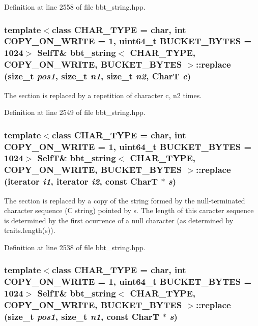 Definition at line 2558 of file bbt\_\-string.hpp.\hypertarget{classbbt__string_146596df06229f2f8b4984a44b07d6dc}{
\subsubsection[{replace}]{\setlength{\rightskip}{0pt plus 5cm}template$<$class CHAR\_\-TYPE  = char, int COPY\_\-ON\_\-WRITE = 1, uint64\_\-t BUCKET\_\-BYTES = 1024$>$ {\bf SelfT}\& {\bf bbt\_\-string}$<$ CHAR\_\-TYPE, COPY\_\-ON\_\-WRITE, BUCKET\_\-BYTES $>$::replace (size\_\-t {\em pos1}, \/  size\_\-t {\em n1}, \/  size\_\-t {\em n2}, \/  CharT {\em c})}}
\label{classbbt__string_146596df06229f2f8b4984a44b07d6dc}


The section is replaced by a repetition of character c, n2 times. 

Definition at line 2549 of file bbt\_\-string.hpp.\hypertarget{classbbt__string_682dfcac635e137557d90c4c2d960c69}{
\subsubsection[{replace}]{\setlength{\rightskip}{0pt plus 5cm}template$<$class CHAR\_\-TYPE  = char, int COPY\_\-ON\_\-WRITE = 1, uint64\_\-t BUCKET\_\-BYTES = 1024$>$ {\bf SelfT}\& {\bf bbt\_\-string}$<$ CHAR\_\-TYPE, COPY\_\-ON\_\-WRITE, BUCKET\_\-BYTES $>$::replace (iterator {\em i1}, \/  iterator {\em i2}, \/  const CharT $\ast$ {\em s})}}
\label{classbbt__string_682dfcac635e137557d90c4c2d960c69}


The section is replaced by a copy of the string formed by the null-terminated character sequence (C string) pointed by s. The length of this caracter sequence is determined by the first ocurrence of a null character (as determined by traits.length(s)). 

Definition at line 2538 of file bbt\_\-string.hpp.\hypertarget{classbbt__string_1bca4b60b45b77a1c806d63f8d441082}{
\subsubsection[{replace}]{\setlength{\rightskip}{0pt plus 5cm}template$<$class CHAR\_\-TYPE  = char, int COPY\_\-ON\_\-WRITE = 1, uint64\_\-t BUCKET\_\-BYTES = 1024$>$ {\bf SelfT}\& {\bf bbt\_\-string}$<$ CHAR\_\-TYPE, COPY\_\-ON\_\-WRITE, BUCKET\_\-BYTES $>$::replace (size\_\-t {\em pos1}, \/  size\_\-t {\em n1}, \/  const CharT $\ast$ {\em s})}}
\label{classbbt__string_1bca4b60b45b77a1c806d63f8d441082}



